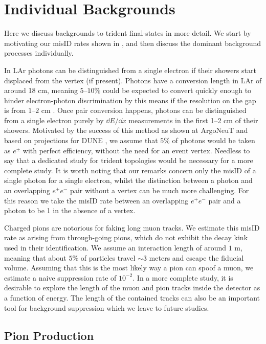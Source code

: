 \section{Individual Backgrounds}
\label{app:backgrounds}
Here we discuss backgrounds to trident final-states in more detail. We start by motivating our misID rates shown in , and then discuss the dominant background processes individually.

In LAr photons can be distinguished from a single electron if their showers start displaced from the vertex (if present). Photons have a conversion length in LAr of around 18 cm, meaning $5$--$10\%$ could be expected to convert quickly enough to hinder electron-photon discrimination by this means if the resolution on the gap is from $1$--$2$ cm \cite{Acciarri:2016sli}. Once pair conversion happens, photons can be distinguished from a single electron purely by $\dd E/\dd x$ measurements in the first 1--2 cm of their showers. Motivated by the success of this method as shown at ArgoNeuT \cite{Acciarri:2016sli} and based on projections for DUNE \cite{Acciarri:2016ooe}, we assume that $5\%$ of photons would be taken as $e^\pm$ with perfect efficiency, without the need for an event vertex. Needless to say that a dedicated study for trident topologies would be necessary for a more complete study. It is worth noting that our remarks concern only the misID of a single photon for a single electron, whilst the distinction between a photon and an overlapping $e^+e^-$ pair without a vertex can be much more challenging. For this reason we take the misID rate between an overlapping $e^+e^-$ pair and a photon to be 1 in the absence of a vertex.  

Charged pions are notorious for faking long muon tracks. We estimate this misID rate as arising from through-going pions, which do not exhibit the decay kink used in their identification. We assume an interaction length of around $1$ m, meaning that about $5\%$ of particles travel $\sim3$ meters and escape the fiducial volume. Assuming that this is the most likely way a pion can spoof a muon, we estimate a naive suppression rate of $10^{-2}$. In a more complete study, it is desirable to explore the length of the muon and pion tracks inside the detector as a function of energy. The length of the contained tracks can also be an important tool for background suppression which we leave to future studies.  

\subsection{Pion Production}

